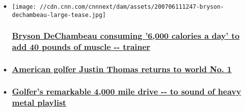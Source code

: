 \begin{itemize}
\item
  \href{/2020/08/06/golf/bryson-dechambeau-calorie-trainer-bulking-muscle-golf-spt-intl/index.html}{}

  \texttt{[image: //cdn.cnn.com/cnnnext/dam/assets/200706111247-bryson-dechambeau-large-tease.jpg]}

  \hypertarget{bryson-dechambeau-consuming-6000-calories-a-day-to-add-40-pounds-of-muscle----trainer}{%
  \subsubsection{\texorpdfstring{\href{/2020/08/06/golf/bryson-dechambeau-calorie-trainer-bulking-muscle-golf-spt-intl/index.html}{Bryson
  DeChambeau consuming '6,000 calories a day' to add 40 pounds of muscle
  -\/-
  trainer}}{Bryson DeChambeau consuming '6,000 calories a day' to add 40 pounds of muscle -\/- trainer}}\label{bryson-dechambeau-consuming-6000-calories-a-day-to-add-40-pounds-of-muscle----trainer}}
\item
  \hypertarget{american-golfer-justin-thomas-returns-to-world-no-1-}{%
  \subsubsection{\texorpdfstring{\href{/2020/08/03/golf/justin-thomas-golf-world-ranking-spt-intl/index.html}{American
  golfer Justin Thomas returns to world No. 1
  }}{American golfer Justin Thomas returns to world No. 1 }}\label{american-golfer-justin-thomas-returns-to-world-no-1-}}
\item
  \hypertarget{golfers-remarkable-4000-mile-drive----to-sound-of-heavy-metal-playlist}{%
  \subsubsection{\texorpdfstring{\href{/2020/07/31/golf/viktor-hovland-road-trip-driving-golf-spt-intl/index.html}{Golfer's
  remarkable 4,000 mile drive -\/- to sound of heavy metal
  playlist}}{Golfer's remarkable 4,000 mile drive -\/- to sound of heavy metal playlist}}\label{golfers-remarkable-4000-mile-drive----to-sound-of-heavy-metal-playlist}}
\end{itemize}

